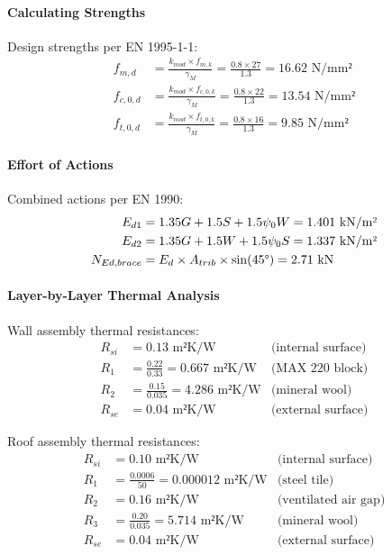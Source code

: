 \documentclass[12pt,a4paper]{article}
\begin{document}
\paragraph{Calculating Strengths}
Design strengths per EN 1995-1-1:
\begin{equation}
\begin{aligned}
f_{m,d} &= \frac{k_{mod} \times f_{m,k}}{\gamma_M} = \frac{0.8 \times 27}{1.3} = 16.62 \text{ N/mm²} \\
f_{c,0,d} &= \frac{k_{mod} \times f_{c,0,k}}{\gamma_M} = \frac{0.8 \times 22}{1.3} = 13.54 \text{ N/mm²} \\
f_{t,0,d} &= \frac{k_{mod} \times f_{t,0,k}}{\gamma_M} = \frac{0.8 \times 16}{1.3} = 9.85 \text{ N/mm²}
\end{aligned}
\end{equation}

\paragraph{Effort of Actions}
Combined actions per EN 1990:
\begin{equation}
\begin{aligned}
E_{d1} &= 1.35G + 1.5S + 1.5\psi_0W = 1.401 \text{ kN/m²} \\
E_{d2} &= 1.35G + 1.5W + 1.5\psi_0S = 1.337 \text{ kN/m²} \\
N_{Ed,brace} &= E_d \times A_{trib} \times \sin(45\degree) = 2.71 \text{ kN}
\end{aligned}
\end{equation}

\paragraph{Layer-by-Layer Thermal Analysis}
Wall assembly thermal resistances:
\begin{equation}
\begin{aligned}
R_{si} &= 0.13 \text{ m²K/W} & \text{(internal surface)} \\
R_1 &= \frac{0.22}{0.33} = 0.667 \text{ m²K/W} & \text{(MAX 220 block)} \\
R_2 &= \frac{0.15}{0.035} = 4.286 \text{ m²K/W} & \text{(mineral wool)} \\
R_{se} &= 0.04 \text{ m²K/W} & \text{(external surface)}
\end{aligned}
\end{equation}

Roof assembly thermal resistances:
\begin{equation}
\begin{aligned}
R_{si} &= 0.10 \text{ m²K/W} & \text{(internal surface)} \\
R_1 &= \frac{0.0006}{50} = 0.000012 \text{ m²K/W} & \text{(steel tile)} \\
R_2 &= 0.16 \text{ m²K/W} & \text{(ventilated air gap)} \\
R_3 &= \frac{0.20}{0.035} = 5.714 \text{ m²K/W} & \text{(mineral wool)} \\
R_{se} &= 0.04 \text{ m²K/W} & \text{(external surface)}
\end{aligned}
\end{equation}
\end{document}
